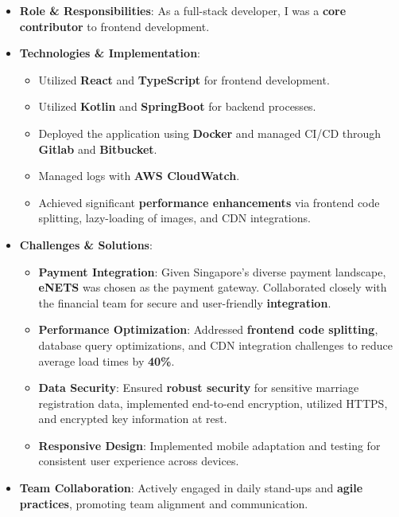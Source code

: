 \documentclass{resume}
\begin{document}
  \begin{itemize}
    \item \textbf{Role \& Responsibilities}: As a full-stack developer, I was a \textbf{core contributor} to frontend development.
    \item \textbf{Technologies \& Implementation}:
      \begin{itemize}
        \item Utilized \textbf{React} and \textbf{TypeScript} for frontend development.
        \item Utilized \textbf{Kotlin} and \textbf{SpringBoot} for backend processes.
        \item Deployed the application using \textbf{Docker} and managed CI/CD through \textbf{Gitlab} and \textbf{Bitbucket}.
        \item Managed logs with \textbf{AWS CloudWatch}.
        \item Achieved significant \textbf{performance enhancements} via frontend code splitting, lazy-loading of images, and CDN integrations.
      \end{itemize}
    \item \textbf{Challenges \& Solutions}:
      \begin{itemize}
        \item \textbf{Payment Integration}: Given Singapore's diverse payment landscape, \textbf{eNETS} was chosen as the payment gateway. Collaborated closely with the financial team for secure and user-friendly \textbf{integration}.
        \item \textbf{Performance Optimization}: Addressed \textbf{frontend code splitting}, database query optimizations, and CDN integration challenges to reduce average load times by \textbf{40\%}.
        \item \textbf{Data Security}: Ensured \textbf{robust security} for sensitive marriage registration data, implemented end-to-end encryption, utilized HTTPS, and encrypted key information at rest.
        \item \textbf{Responsive Design}: Implemented mobile adaptation and testing for consistent user experience across devices.
      \end{itemize}
    \item \textbf{Team Collaboration}: Actively engaged in daily stand-ups and \textbf{agile practices}, promoting team alignment and communication.
  \end{itemize}
  
\end{document}
